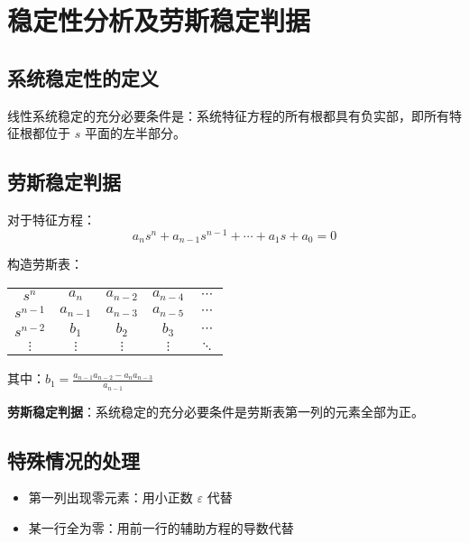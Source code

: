 \section{稳定性分析及劳斯稳定判据}

\subsection{系统稳定性的定义}
线性系统稳定的充分必要条件是：系统特征方程的所有根都具有负实部，即所有特征根都位于 $s$ 平面的左半部分。

\subsection{劳斯稳定判据}
对于特征方程：
\[a_n s^n + a_{n-1}s^{n-1} + \cdots + a_1 s + a_0 = 0\]

构造劳斯表：
\begin{center}
\begin{tabular}{c|cccc}
$s^n$ & $a_n$ & $a_{n-2}$ & $a_{n-4}$ & $\cdots$ \\
$s^{n-1}$ & $a_{n-1}$ & $a_{n-3}$ & $a_{n-5}$ & $\cdots$ \\
$s^{n-2}$ & $b_1$ & $b_2$ & $b_3$ & $\cdots$ \\
$\vdots$ & $\vdots$ & $\vdots$ & $\vdots$ & $\ddots$ \\
\end{tabular}
\end{center}

其中：$b_1 = \frac{a_{n-1}a_{n-2} - a_n a_{n-3}}{a_{n-1}}$

\textbf{劳斯稳定判据}：系统稳定的充分必要条件是劳斯表第一列的元素全部为正。

\subsection{特殊情况的处理}
\begin{itemize}
    \item 第一列出现零元素：用小正数 $\varepsilon$ 代替
    \item 某一行全为零：用前一行的辅助方程的导数代替
\end{itemize}
